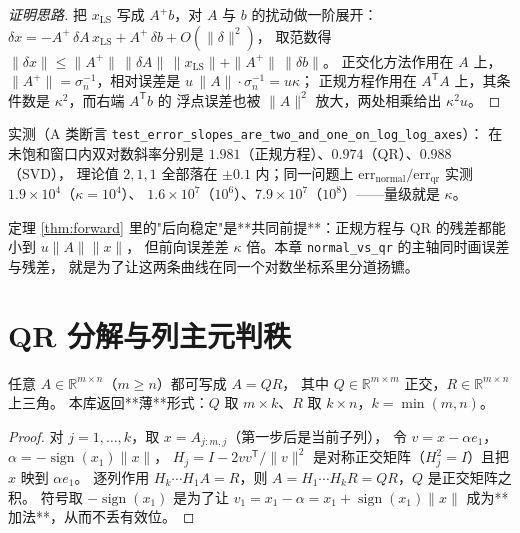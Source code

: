 \begin{proof}[证明思路]
把 $x_{\mathrm{LS}}$ 写成 $A^{+}b$，对 $A$ 与 $b$ 的扰动做一阶展开：
$\delta x=-A^{+}\,\delta A\,x_{\mathrm{LS}}+A^{+}\,\delta b+O(\|\delta\|^2)$，
取范数得 $\|\delta x\|\le\|A^{+}\|\,\|\delta A\|\,\|x_{\mathrm{LS}}\|+\|A^{+}\|\,\|\delta b\|$。
正交化方法作用在 $A$ 上，$\|A^{+}\|=\sigma_n^{-1}$，相对误差是 $u\,\|A\|\cdot\sigma_n^{-1}=u\kappa$；
正规方程作用在 $A^{\mathsf T}A$ 上，其条件数是 $\kappa^2$，而右端 $A^{\mathsf T}b$ 的
浮点误差也被 $\|A\|^2$ 放大，两处相乘给出 $\kappa^2u$。
\end{proof}

实测（A 类断言 \texttt{test\_error\_slopes\_are\_two\_and\_one\_on\_log\_log\_axes}）：
在未饱和窗口内双对数斜率分别是 $1.981$（正规方程）、$0.974$（QR）、$0.988$（SVD），
理论值 $2,1,1$ 全部落在 $\pm0.1$ 内；同一问题上
$\mathrm{err}_{\text{normal}}/\mathrm{err}_{\text{qr}}$ 实测 $1.9\times10^{4}$（$\kappa=10^{4}$）、
$1.6\times10^{7}$（$10^{6}$）、$7.9\times10^{7}$（$10^{8}$）——量级就是 $\kappa$。

\begin{remark}[残差小不等于解准]
定理 \ref{thm:forward} 里的"后向稳定"是**共同前提**：正规方程与 QR 的残差都能小到 $u\|A\|\|x\|$，
但前向误差差 $\kappa$ 倍。本章 \texttt{normal\_vs\_qr} 的主轴同时画误差与残差，
就是为了让这两条曲线在同一个对数坐标系里分道扬镳。
\end{remark}

\section{QR 分解与列主元判秩}

\begin{theorem}[Householder QR]
\label{thm:qr}
任意 $A\in\mathbb{R}^{m\times n}$（$m\ge n$）都可写成 $A=QR$，
其中 $Q\in\mathbb{R}^{m\times m}$ 正交，$R\in\mathbb{R}^{m\times n}$ 上三角。
本库返回**薄**形式：$Q$ 取 $m\times k$、$R$ 取 $k\times n$，$k=\min(m,n)$。
\end{theorem}

\begin{proof}
对 $j=1,\dots,k$，取 $x=A_{j:m,j}$（第一步后是当前子列），
令 $v=x-\alpha e_1$，$\alpha=-\operatorname{sign}(x_1)\|x\|$，
$H_j=I-2vv^{\mathsf T}/\|v\|^2$ 是对称正交矩阵（$H_j^2=I$）且把 $x$ 映到 $\alpha e_1$。
逐列作用 $H_k\cdots H_1A=R$，则 $A=H_1\cdots H_kR=QR$，$Q$ 是正交矩阵之积。
符号取 $-\operatorname{sign}(x_1)$ 是为了让 $v_1=x_1-\alpha=x_1+\operatorname{sign}(x_1)\|x\|$
成为**加法**，从而不丢有效位。
\end{proof}

